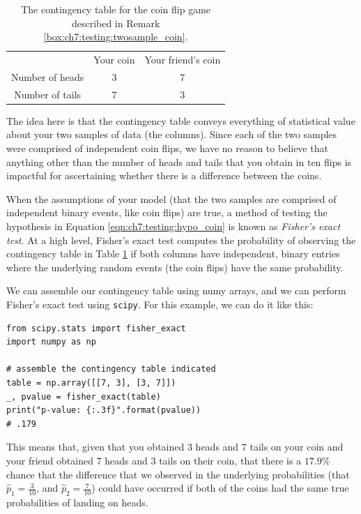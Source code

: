 \begin{table}[h]
    \centering
    \begin{tabular}{c | c|c}
         & Your coin & Your friend's coin  \\
         Number of heads & 3 & 7 \\
         Number of tails & 7 & 3
    \end{tabular}
    \caption{The contingency table for the coin flip game described in Remark \ref{box:ch7:testing:twosample_coin}.}
    \label{tab:ch7:testing:cont}
\end{table}

The idea here is that the contingency table conveys everything of statistical value about your two samples of data (the columns). Since each of the two samples were comprised of independent coin flips, we have no reason to believe that anything other than the number of heads and tails that you obtain in ten flips is impactful for ascertaining whether there is a difference between the coins. 

When the assumptions of your model (that the two samples are comprised of independent binary events, like coin flips) are true, a method of testing the hypothesis in Equation \eqref{eqn:ch7:testing:hypo_coin} is known as \textit{Fisher's exact test}. At a high level, Fisher's exact test computes the probability of observing the contingency table in Table \ref{tab:ch7:testing:cont} if both columns have independent, binary entries where the underlying random events (the coin flips) have the same probability. 

We can assemble our contingency table using numy arrays, and we can perform Fisher's exact test using \texttt{scipy}. For this example, we can do it like this:

\begin{lstlisting}[style=python]
from scipy.stats import fisher_exact
import numpy as np

# assemble the contingency table indicated
table = np.array([[7, 3], [3, 7]])
_, pvalue = fisher_exact(table)
print("p-value: {:.3f}".format(pvalue))
# .179
\end{lstlisting}

This means that, given that you obtained $3$ heads and $7$ tails on your coin and your friend obtained $7$ heads and $3$ tails on their coin, that there is a $17.9\%$ chance that the difference that we observed in the underlying probabilities (that $\hat p_1 = \frac{3}{10}$, and $\hat p_2 = \frac{7}{10}$) could have occurred if both of the coins had the same true probabilities of landing on heads. 

